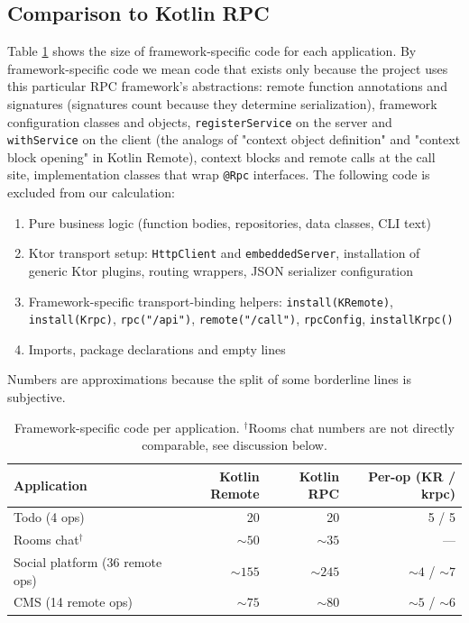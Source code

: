 \documentclass[a4paper,11pt,oneside]{article}
\newcommand{\kotlini}[1]{\texttt{#1}}
\begin{document}
\subsection{Comparison to Kotlin RPC}

Table \ref{loc_table} shows the size of framework-specific code for each application. By
framework-specific code we mean code that exists only because the project uses this particular
RPC framework's abstractions: remote function annotations and signatures (signatures count
because they determine serialization), framework configuration classes and objects,
\kotlini{registerService} on the server and \kotlini{withService} on the client (the analogs
of "context object definition" and "context block opening" in Kotlin Remote), context blocks
and remote calls at the call site, implementation classes that wrap \kotlini{@Rpc} interfaces.
The following code is excluded from our calculation:
\begin{enumerate}
	\item Pure business logic (function bodies, repositories, data classes, CLI text)
	\item Ktor transport setup: \kotlini{HttpClient} and \kotlini{embeddedServer}, installation of
	      generic Ktor plugins, routing wrappers, JSON serializer configuration
	\item Framework-specific transport-binding helpers: \kotlini{install(KRemote)}, \kotlini{install(Krpc)},
	      \kotlini{rpc("/api")}, \kotlini{remote("/call")}, \kotlini{rpcConfig}, \kotlini{installKrpc()}
	\item Imports, package declarations and empty lines
\end{enumerate}
Numbers are approximations because the split of some borderline lines is subjective.

\begin{table}[!h]
  \begin{center}
    \begin{tabular}{lrrr}
      \toprule
      Application & Kotlin Remote & Kotlin RPC & Per-op (KR / krpc) \\
      \midrule
      Todo (4 ops) & 20 & 20 & 5 / 5 \\
      Rooms chat$^{\dagger}$ & ${\sim}50$ & ${\sim}35$ & --- \\
      Social platform (36 remote ops) & ${\sim}155$ & ${\sim}245$ & ${\sim}4$ / ${\sim}7$ \\
      CMS (14 remote ops) & ${\sim}75$ & ${\sim}80$ & ${\sim}5$ / ${\sim}6$ \\
      \bottomrule
    \end{tabular}
    \caption{Framework-specific code per application. $^{\dagger}$Rooms chat numbers
    are not directly comparable, see discussion below.}\label{loc_table}
  \end{center}
\end{table}
\end{document}
